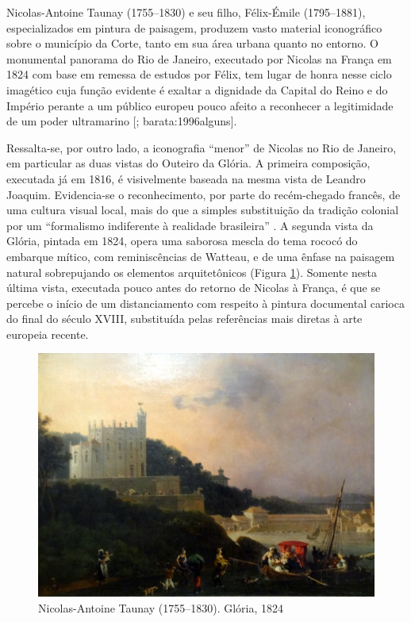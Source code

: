 Nicolas-Antoine Taunay (1755--1830) e seu filho, Félix-Émile
(1795--1881), especializados em pintura de paisagem, produzem vasto
material iconográfico sobre o município da Corte, tanto em sua área
urbana quanto no entorno. O monumental panorama do Rio de Janeiro,
executado por Nicolas na França em 1824 com base em remessa de estudos
por Félix, tem lugar de honra nesse ciclo imagético cuja função evidente
é exaltar a dignidade da Capital do Reino e do Império perante a um
público europeu pouco afeito a reconhecer a legitimidade de um poder
ultramarino {[}\textcite{pereira:1994romantismo}; barata:1996alguns{]}.

Ressalta-se, por outro lado, a iconografia ``menor'' de Nicolas no Rio
de Janeiro, em particular as duas vistas do Outeiro da Glória. A
primeira composição, executada já em 1816, é visivelmente baseada na
mesma vista de Leandro Joaquim. Evidencia-se o reconhecimento, por parte
do recém-chegado francês, de uma cultura visual local, mais do que a
simples substituição da tradição colonial por um ``formalismo
indiferente à realidade brasileira''
\autocite[p.~49]{campofiorito:1983historia}. A segunda vista da Glória,
pintada em 1824, opera uma saborosa mescla do tema rococó do embarque
mítico, com reminiscências de Watteau, e de uma ênfase na paisagem
natural sobrepujando os elementos arquitetônicos (Figura
\ref{fig:nicolas}). Somente nesta última vista, executada pouco antes do
retorno de Nicolas à França, é que se percebe o início de um
distanciamento com respeito à pintura documental carioca do final do
século XVIII, substituída pelas referências mais diretas à arte europeia
recente.

\begin{figure}
\hypertarget{fig:nicolas}{%
\centering
\includegraphics{figures/mar_rio_taunay_gloria_1824.jpeg}
\caption{Nicolas-Antoine Taunay (1755--1830). Glória,
1824}\label{fig:nicolas}
}
\end{figure}
